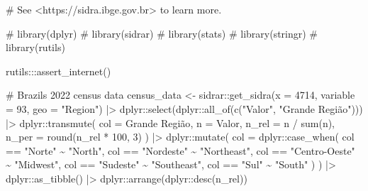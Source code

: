 \documentclass[
  12pt,
  a4paper,
  oneside]{tesesusp}
\newenvironment{Shaded}{\begin{snugshade}}{\end{snugshade}}
\newcommand{\AttributeTok}[1]{\textcolor[rgb]{0.40,0.45,0.13}{#1}}
\newcommand{\CommentTok}[1]{\textcolor[rgb]{0.37,0.37,0.37}{#1}}
\newcommand{\DecValTok}[1]{\textcolor[rgb]{0.68,0.00,0.00}{#1}}
\newcommand{\FunctionTok}[1]{\textcolor[rgb]{0.28,0.35,0.67}{#1}}
\newcommand{\NormalTok}[1]{\textcolor[rgb]{0.00,0.23,0.31}{#1}}
\newcommand{\OtherTok}[1]{\textcolor[rgb]{0.00,0.23,0.31}{#1}}
\newcommand{\SpecialCharTok}[1]{\textcolor[rgb]{0.37,0.37,0.37}{#1}}
\newcommand{\StringTok}[1]{\textcolor[rgb]{0.13,0.47,0.30}{#1}}
\begin{document}
\begin{Shaded}
\begin{Highlighting}[numbers=left,,]
\CommentTok{\# See \textless{}https://sidra.ibge.gov.br\textgreater{} to learn more.}

\CommentTok{\# library(dplyr)}
\CommentTok{\# library(sidrar)}
\CommentTok{\# library(stats)}
\CommentTok{\# library(stringr)}
\CommentTok{\# library(rutils)}

\NormalTok{rutils}\SpecialCharTok{:::}\FunctionTok{assert\_internet}\NormalTok{()}

\CommentTok{\# Brazil\textquotesingle{}s 2022 census data}
\NormalTok{census\_data }\OtherTok{\textless{}{-}} 
\NormalTok{  sidrar}\SpecialCharTok{::}\FunctionTok{get\_sidra}\NormalTok{(}\AttributeTok{x =} \DecValTok{4714}\NormalTok{, }\AttributeTok{variable =} \DecValTok{93}\NormalTok{, }\AttributeTok{geo =} \StringTok{"Region"}\NormalTok{) }\SpecialCharTok{|\textgreater{}}
\NormalTok{  dplyr}\SpecialCharTok{::}\FunctionTok{select}\NormalTok{(dplyr}\SpecialCharTok{::}\FunctionTok{all\_of}\NormalTok{(}\FunctionTok{c}\NormalTok{(}\StringTok{"Valor"}\NormalTok{, }\StringTok{"Grande Região"}\NormalTok{))) }\SpecialCharTok{|\textgreater{}}
\NormalTok{  dplyr}\SpecialCharTok{::}\FunctionTok{transmute}\NormalTok{(}
    \AttributeTok{col =} \StringTok{\textasciigrave{}}\AttributeTok{Grande Região}\StringTok{\textasciigrave{}}\NormalTok{,}
    \AttributeTok{n =}\NormalTok{ Valor,}
    \AttributeTok{n\_rel =}\NormalTok{ n }\SpecialCharTok{/} \FunctionTok{sum}\NormalTok{(n),}
    \AttributeTok{n\_per =} \FunctionTok{round}\NormalTok{(n\_rel }\SpecialCharTok{*} \DecValTok{100}\NormalTok{, }\DecValTok{3}\NormalTok{)}
\NormalTok{    ) }\SpecialCharTok{|\textgreater{}}
\NormalTok{  dplyr}\SpecialCharTok{::}\FunctionTok{mutate}\NormalTok{(}
    \AttributeTok{col =}\NormalTok{ dplyr}\SpecialCharTok{::}\FunctionTok{case\_when}\NormalTok{(}
\NormalTok{      col }\SpecialCharTok{==} \StringTok{"Norte"} \SpecialCharTok{\textasciitilde{}} \StringTok{"North"}\NormalTok{,}
\NormalTok{      col }\SpecialCharTok{==} \StringTok{"Nordeste"} \SpecialCharTok{\textasciitilde{}} \StringTok{"Northeast"}\NormalTok{,}
\NormalTok{      col }\SpecialCharTok{==} \StringTok{"Centro{-}Oeste"} \SpecialCharTok{\textasciitilde{}} \StringTok{"Midwest"}\NormalTok{,}
\NormalTok{      col }\SpecialCharTok{==} \StringTok{"Sudeste"} \SpecialCharTok{\textasciitilde{}} \StringTok{"Southeast"}\NormalTok{,}
\NormalTok{      col }\SpecialCharTok{==} \StringTok{"Sul"} \SpecialCharTok{\textasciitilde{}} \StringTok{"South"}
\NormalTok{    )}
\NormalTok{  ) }\SpecialCharTok{|\textgreater{}}
\NormalTok{  dplyr}\SpecialCharTok{::}\FunctionTok{as\_tibble}\NormalTok{() }\SpecialCharTok{|\textgreater{}}
\NormalTok{  dplyr}\SpecialCharTok{::}\FunctionTok{arrange}\NormalTok{(dplyr}\SpecialCharTok{::}\FunctionTok{desc}\NormalTok{(n\_rel))}


\end{Highlighting}
\end{Shaded}
\end{document}
